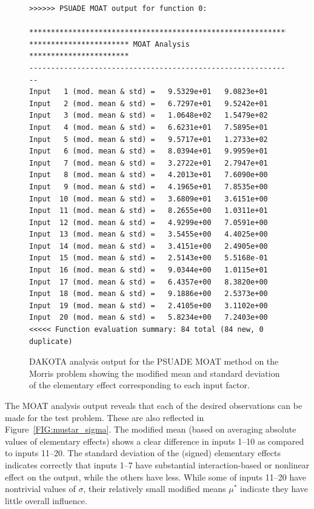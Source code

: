 \begin{figure}[ht!]
\centering
\begin{bigbox}
\begin{small}
\begin{verbatim}
>>>>>> PSUADE MOAT output for function 0:

*************************************************************
*********************** MOAT Analysis ***********************
-------------------------------------------------------------
Input   1 (mod. mean & std) =   9.5329e+01   9.0823e+01 
Input   2 (mod. mean & std) =   6.7297e+01   9.5242e+01 
Input   3 (mod. mean & std) =   1.0648e+02   1.5479e+02 
Input   4 (mod. mean & std) =   6.6231e+01   7.5895e+01 
Input   5 (mod. mean & std) =   9.5717e+01   1.2733e+02 
Input   6 (mod. mean & std) =   8.0394e+01   9.9959e+01 
Input   7 (mod. mean & std) =   3.2722e+01   2.7947e+01 
Input   8 (mod. mean & std) =   4.2013e+01   7.6090e+00 
Input   9 (mod. mean & std) =   4.1965e+01   7.8535e+00 
Input  10 (mod. mean & std) =   3.6809e+01   3.6151e+00 
Input  11 (mod. mean & std) =   8.2655e+00   1.0311e+01 
Input  12 (mod. mean & std) =   4.9299e+00   7.0591e+00 
Input  13 (mod. mean & std) =   3.5455e+00   4.4025e+00 
Input  14 (mod. mean & std) =   3.4151e+00   2.4905e+00 
Input  15 (mod. mean & std) =   2.5143e+00   5.5168e-01 
Input  16 (mod. mean & std) =   9.0344e+00   1.0115e+01 
Input  17 (mod. mean & std) =   6.4357e+00   8.3820e+00 
Input  18 (mod. mean & std) =   9.1886e+00   2.5373e+00 
Input  19 (mod. mean & std) =   2.4105e+00   3.1102e+00 
Input  20 (mod. mean & std) =   5.8234e+00   7.2403e+00 
<<<<< Function evaluation summary: 84 total (84 new, 0 duplicate)
\end{verbatim}
\end{small}
\end{bigbox}
\caption[DAKOTA analysis output for PSUADE
MOAT.]{\label{FIG:moat:out_results} DAKOTA analysis output for the
PSUADE MOAT method on the Morris problem showing the modified
mean and standard deviation of the elementary effect corresponding to
each input factor.}
\end{figure}
The MOAT analysis output reveals that each of the desired observations
can be made for the test problem.  These are also reflected in
Figure~\ref{FIG:mustar_sigma}.  The modified mean (based on averaging
absolute values of elementary effects) shows a clear difference in
inputs 1--10 as compared to inputs 11--20.  The standard deviation of
the (signed) elementary effects indicates correctly that inputs 1--7
have substantial interaction-based or nonlinear effect on the output,
while the others have less.  While some of inputs 11--20 have
nontrivial values of $\sigma$, their relatively small modified means
$\mu^*$ indicate they have little overall influence.


